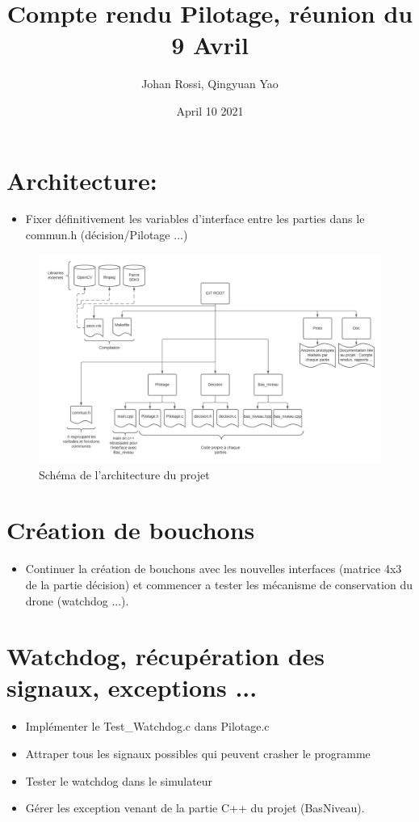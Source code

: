 \documentclass{article}
\title{Compte rendu Pilotage, réunion du 9 Avril}
\author{Johan Rossi, Qingyuan Yao}
\date{April 10 2021}
\begin{document}
\maketitle

\section{Architecture:}
\begin{itemize}
    \item Fixer définitivement les variables d'interface entre les parties dans le commun.h (décision/Pilotage ...)
\end{itemize}

\begin{figure}[h]
\caption{Schéma de l'architecture du projet}
\includegraphics[scale=0.5]{Architecture projet Drone (1).png}
\centering
\end{figure}

\section{Création de bouchons}
\begin{itemize}
    \item Continuer la création de bouchons avec les nouvelles interfaces (matrice 4x3 de la partie décision) et commencer a tester les mécanisme de conservation du drone (watchdog ...).
\end{itemize}

\section{Watchdog, récupération des signaux, exceptions ...}
\begin{itemize}
    \item Implémenter le Test\_Watchdog.c dans Pilotage.c
    \item Attraper tous les signaux possibles qui peuvent crasher le programme
    \item Tester le watchdog dans le simulateur
    \item Gérer les exception venant de la partie C++ du projet (BasNiveau).
\end{itemize}
\end{document}
